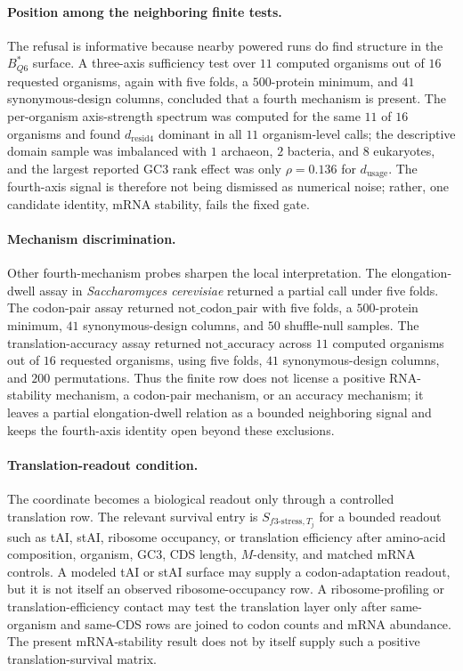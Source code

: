 \paragraph{Position among the neighboring finite tests.}
The refusal is informative because nearby powered runs do find structure in the $B^{\ast}_{Q6}$ surface.  A three-axis sufficiency test over $11$ computed organisms out of $16$ requested organisms, again with five folds, a $500$-protein minimum, and $41$ synonymous-design columns, concluded that a fourth mechanism is present.  The per-organism axis-strength spectrum was computed for the same $11$ of $16$ organisms and found $d_{\mathrm{resid4}}$ dominant in all $11$ organism-level calls; the descriptive domain sample was imbalanced with $1$ archaeon, $2$ bacteria, and $8$ eukaryotes, and the largest reported GC3 rank effect was only $\rho=0.136$ for $d_{\mathrm{usage}}$.  The fourth-axis signal is therefore not being dismissed as numerical noise; rather, one candidate identity, mRNA stability, fails the fixed gate.

\paragraph{Mechanism discrimination.}
Other fourth-mechanism probes sharpen the local interpretation.  The elongation-dwell assay in \emph{Saccharomyces cerevisiae} returned a partial call under five folds.  The codon-pair assay returned $\mathrm{not\_codon\_pair}$ with five folds, a $500$-protein minimum, $41$ synonymous-design columns, and $50$ shuffle-null samples.  The translation-accuracy assay returned $\mathrm{not\_accuracy}$ across $11$ computed organisms out of $16$ requested organisms, using five folds, $41$ synonymous-design columns, and $200$ permutations.  Thus the finite row does not license a positive RNA-stability mechanism, a codon-pair mechanism, or an accuracy mechanism; it leaves a partial elongation-dwell relation as a bounded neighboring signal and keeps the fourth-axis identity open beyond these exclusions.

\paragraph{Translation-readout condition.}
The coordinate becomes a biological readout only through a controlled translation row.  The relevant survival entry is $S_{f3\text{-}\mathrm{stress},T_j}$ for a bounded readout such as tAI, stAI, ribosome occupancy, or translation efficiency after amino-acid composition, organism, GC3, CDS length, $M$-density, and matched mRNA controls.  A modeled tAI or stAI surface may supply a codon-adaptation readout, but it is not itself an observed ribosome-occupancy row.  A ribosome-profiling or translation-efficiency contact may test the translation layer only after same-organism and same-CDS rows are joined to codon counts and mRNA abundance.  The present mRNA-stability result does not by itself supply such a positive translation-survival matrix.

